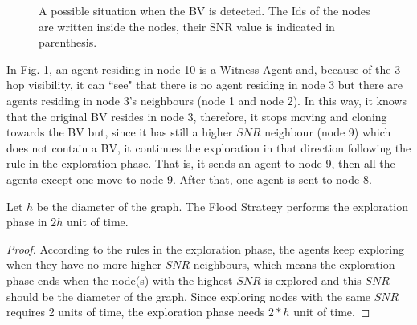 \begin{figure} [H]
\caption{A possible situation when the BV is detected. The Ids of the nodes are written inside the nodes, their SNR value is indicated in parenthesis.} 
  \label{fig:BVd} %
\end{figure}    

 
In Fig. \ref{fig:BVd}, an agent residing in node 10 is a Witness Agent and, because of the 3-hop visibility, it can ``see" that there is no agent residing in node 3 but there are agents residing in node 3's neighbours  (node 1 and node 2). In this way, it knows that the original BV resides in node 3, therefore, it stops moving and cloning towards the BV but,  since it has still   a higher $SNR$ neighbour (node 9) which does not contain a BV,   it continues the exploration in that direction following the rule in the exploration phase. That is, it sends an agent to node 9, then all the agents except one move to node 9. After that, one agent is sent to node 8. 

\begin{theorem}
Let $h$ be  the diameter of the graph. The Flood Strategy performs the exploration phase in  $2h$ unit of time.
\end{theorem}
\begin{proof}
According to the rules in the exploration phase, the agents keep exploring when they have no more higher $SNR$ neighbours, which means the exploration phase ends when the node(s) with the highest $SNR$ is explored and this $SNR$ should be the diameter of the graph. Since exploring nodes with the same $SNR$ requires 2 units of time, the exploration phase needs $2*h$ unit of time.
\end{proof}


